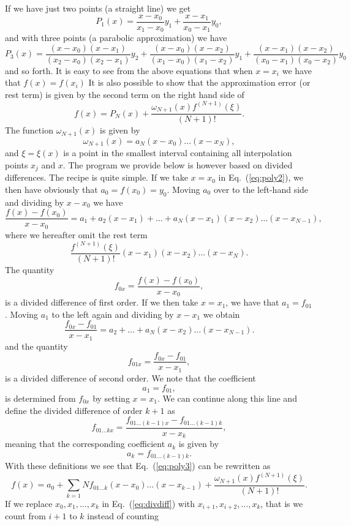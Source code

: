 If we have just two points (a straight line) we get
\[
   P_1(x)=\frac{x-x_0}{x_1-x_0}y_1+\frac{x-x_1}{x_0-x_1}y_0,
\]
and with three points (a parabolic approximation) we have
\[
     P_3(x)=\frac{(x-x_0)(x-x_1)}{(x_2-x_0)(x_2-x_1)}y_2+
            \frac{(x-x_0)(x-x_2)}{(x_1-x_0)(x_1-x_2)}y_1+
            \frac{(x-x_1)(x-x_2)}{(x_0-x_1)(x_0-x_2)}y_0
\]
and so forth. It is easy to see from the above equations that when
$x=x_i$ we have that $f(x)=f(x_i)$
It is also possible to show that the approximation error (or rest term) is given by
the second term on the right hand side of 
\begin{equation}
    f(x)=P_N(x)+\frac{\omega_{N+1}(x)f^{(N+1)}(\xi)}{(N+1)!}.
    \label{eq:poly3}
\end{equation}
The function $\omega_{N+1}(x)$ is given by
\[
   \omega_{N+1}(x)=a_N(x-x_0)\dots(x-x_{N}),
\]
and $\xi=\xi(x)$ is a point in the smallest interval containing 
all interpolation points $x_j$ and $x$. 
The program we provide below 
is however based on divided differences. The recipe is quite simple. If we take
$x=x_0$ in Eq.\ (\ref{eq:poly2}), we then have obviously that 
$a_0=f(x_0)=y_0$. Moving $a_0$ over to the left-hand  side and dividing
by $x-x_0$ we have
\[
   \frac{f(x)-f(x_0)}{x-x_0}=a_1+a_2(x-x_1) + \dots+ a_N(x-x_1)(x-x_2)\dots(x-x_{N-1}),
\]
where we hereafter omit the rest term 
\[ 
   \frac{f^{(N+1)}(\xi)}{(N+1)!}(x-x_1)(x-x_2)\dots(x-x_{N}).
\]
The quantity
\[
   f_{0x}=\frac{f(x)-f(x_0)}{x-x_0},
\]
is a divided difference of first order. If we then take $x=x_1$, we have that
$a_1=f_{01}$. Moving $a_1$ to the left again and dividing by $x-x_1$ we obtain
\[ 
   \frac{f_{0x}-f_{01}}{x-x_1}=a_2 + \dots+ a_N(x-x_2)\dots(x-x_{N-1}).
\]
and the quantity 
\[
   f_{01x}=\frac{f_{0x}-f_{01}}{x-x_1},
\]
is a divided difference of second order. We note that the coefficient
\[ 
   a_1=f_{01},
\] 
is determined from $f_{0x}$ by setting $x=x_1$. We can continue along this line
and define the divided difference of order $k+1$ as 
\begin{equation}
   f_{01\dots kx}=\frac{f_{01\dots (k-1)x}-f_{01\dots(k-1)k}}{x-x_k},
   \label{eq:divdiff}
\end{equation}
meaning that the corresponding coefficient $a_k$ is given by
\[ 
   a_k=f_{01\dots(k-1)k}.
\]
With these definitions we see that Eq.\ (\ref{eq:poly3}) can be rewritten as
\[
        f(x)=a_0+\sum_{k=1}{N}f_{01\dots k}(x-x_0)\dots(x-x_{k-1})+\frac{\omega_{N+1}(x)f^{(N+1)}(\xi)}{(N+1)!}.   
\]
If we replace $x_0,x_1,\dots,x_k$ in Eq.\ (\ref{eq:divdiff}) with 
$x_{i+1},x_{i+2},\dots,x_k$, that is we count from $i+1$ to $k$ instead of counting 
